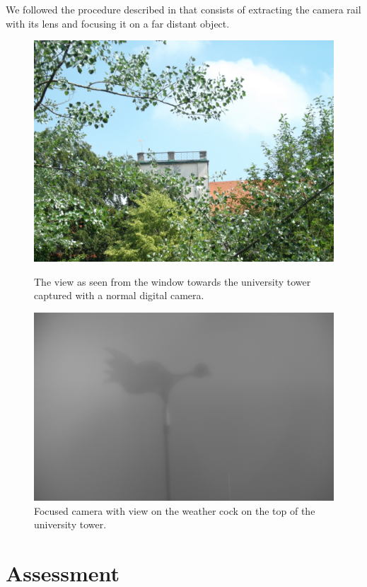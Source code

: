 We followed the procedure described in \cite{Hertlein2017} that consists of
extracting the camera rail with its lens and focusing it on a far distant
object.

\begin{figure}[ht]
  \centering
  \includegraphics[width=\linewidth]{images/focus/view3.jpg}
    \caption{The view as seen from the window towards the university tower
      captured with a normal digital camera.}
    \label{fig:camerafocus:view}
  \endminipage
  \hfill
    \includegraphics[width=\linewidth]{images/focus/focus3.jpg}
    \caption{Focused camera with view on the weather cock on the top of the
    university tower.}
    \label{fig:camerafocus:cock}
  \endminipage
  \hfill
\end{figure}

\section{Assessment}

